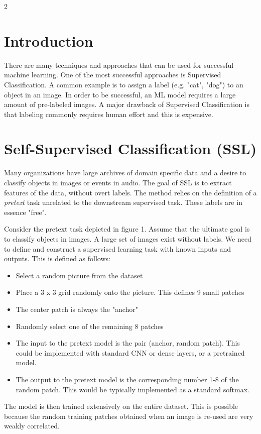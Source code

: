 \documentclass{article}
\begin{document}
\begin{multicols}{2}
\section{Introduction}
There are many techniques and approaches that can be used for successful machine learning.  One of the most successful approaches is Supervised Classification.  A common example is to assign a label (e.g. "cat", "dog") to an object in an image.  In order to be successful, an ML model requires a large amount of pre-labeled images.  A major drawback of Supervised Classification is that labeling commonly requires human effort and this is expensive.   

  

\section{Self-Supervised Classification (SSL)}
Many organizations have large archives of domain specific data and a desire to classify objects in images or events in audio.  The goal of SSL is to extract  features of the data, without overt labels.  The method relies on the definition of a \textit{pretext} task unrelated to the downstream supervised task.  These labels are in essence "free".

Consider the pretext task depicted in figure 1.  Assume that the ultimate goal is to classify objects in images.  A large set of images exist without labels. We need to define and construct a supervised learning task with known inputs and outputs.  This is defined as follows:
\begin{itemize}
\item Select a random picture from the dataset
\item Place a 3 x 3 grid randomly onto the picture.  This defines 9 small patches
\item The center patch is always the "anchor" 
\item Randomly select one of the remaining 8 patches 
\item The input to the pretext model is the pair (anchor, random patch).  This could be implemented with standard CNN or dense layers, or a pretrained model.
\item The output to the pretext model is the corresponding number 1-8 of the random patch.  This would be typically implemented as a standard softmax.

\end{itemize}
The model is then trained extensively on the entire dataset.  This is possible because the random training patches obtained when an image is re-used are very weakly correlated.


\end{multicols}
\end{document}
